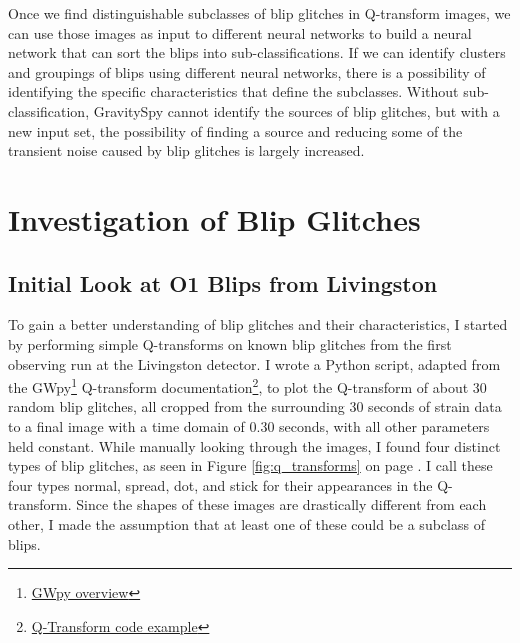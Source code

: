 \documentclass[a4paper]{article}
\begin{document}
Once we find distinguishable subclasses of blip glitches in Q-transform images, we can use those images as input to different neural networks to build a neural network that can sort the blips into sub-classifications. If we can identify clusters and groupings of blips using different neural networks, there is a possibility of identifying the specific characteristics that define the subclasses. Without sub-classification, GravitySpy cannot identify the sources of blip glitches, but with a new input set, the possibility of finding a source and reducing some of the transient noise caused by blip glitches is largely increased. 

\section{Investigation of Blip Glitches}

\subsection{Initial Look at O1 Blips from Livingston} \label{investigation}

To gain a better understanding of blip glitches and their characteristics, I started by performing simple Q-transforms on known blip glitches from the first observing run at the Livingston detector. I wrote a Python script, adapted from the GWpy\footnote{\href{https://gwpy.github.io/docs/stable/overview.html}{GWpy overview}} Q-transform documentation\footnote{\href{https://gwpy.github.io/docs/stable/examples/timeseries/qscan.html}{Q-Transform code example}}, to plot the Q-transform of about 30 random blip glitches, all cropped from the surrounding 30 seconds of strain data to a final image with a time domain of 0.30 seconds, with all other parameters held constant. While manually looking through the images, I found four distinct types of blip glitches, as seen in Figure \ref{fig:q_transforms} on page \pageref{fig:q_transforms}. I call these four types normal, spread, dot, and stick for their appearances in the Q-transform. Since the shapes of these images are drastically different from each other, I made the assumption that at least one of these could be a subclass of blips.
\end{document}
